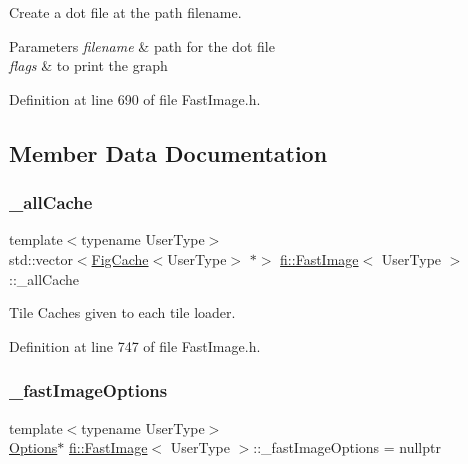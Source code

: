 Create a dot file at the path filename. 


\begin{DoxyParams}{Parameters}
{\em filename} & path for the dot file \\
\hline
{\em flags} & to print the graph \\
\hline
\end{DoxyParams}


Definition at line 690 of file Fast\+Image.\+h.



\subsection{Member Data Documentation}
\mbox{\label{classfi_1_1FastImage_aea01a1147574f77e4f656e5f0525236b}} 
\subsubsection{\texorpdfstring{\+\_\+all\+Cache}{\_allCache}}
{\footnotesize\ttfamily template$<$typename User\+Type$>$ \\
std\+::vector$<$\hyperlink{classfi_1_1FigCache}{Fig\+Cache}$<$User\+Type$>$ $\ast$$>$ \hyperlink{classfi_1_1FastImage}{fi\+::\+Fast\+Image}$<$ User\+Type $>$\+::\+\_\+all\+Cache\hspace{0.3cm}{\ttfamily [private]}}



Tile Caches given to each tile loader. 



Definition at line 747 of file Fast\+Image.\+h.

\mbox{\label{classfi_1_1FastImage_a3ee97b9a34ba54a51254d308506403fb}} 
\subsubsection{\texorpdfstring{\+\_\+fast\+Image\+Options}{\_fastImageOptions}}
{\footnotesize\ttfamily template$<$typename User\+Type$>$ \\
\hyperlink{classfi_1_1FastImage_1_1Options}{Options}$\ast$ \hyperlink{classfi_1_1FastImage}{fi\+::\+Fast\+Image}$<$ User\+Type $>$\+::\+\_\+fast\+Image\+Options = nullptr\hspace{0.3cm}{\ttfamily [private]}}



